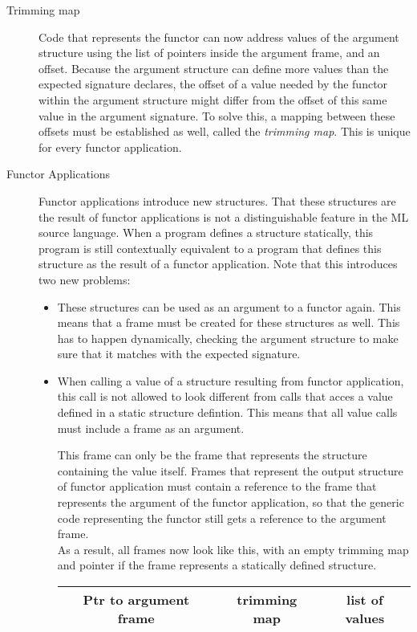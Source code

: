 \documentclass[11pt]{article}
\newcommand{\gray}{\cellcolor{lightgray}}
\begin{document}
\begin{description}
\item[Trimming map]
Code that represents the functor can now address values of the argument structure using the list of pointers inside the argument frame, and an offset.
Because the argument structure can define more values than the expected signature declares, the offset of a value needed by the functor within the argument structure might differ from the offset of this same value in the argument signature.
To solve this, a mapping between these offsets must be established as well, called the \emph{trimming map}. This is unique for every functor application.

\item[Functor Applications]
Functor applications introduce new structures. 
That these structures are the result of functor applications is not a distinguishable feature in the ML source language.
When a program defines a structure statically, this program is still contextually equivalent to a program that defines this structure as the result of a functor application.
Note that this introduces two new problems:
\begin{itemize}
\item 
These structures can be used as an argument to a functor again. This means that a frame must be created for these structures as well.
This has to happen dynamically, checking the argument structure to make sure that it matches with the expected signature.

\item When calling a value of a structure resulting from functor application, this call is not allowed to look different from calls that acces a value defined in a static structure defintion.
This means that all value calls must include a frame as an argument.

This frame can only be the frame that represents the structure containing the value itself.
Frames that represent the output structure of functor application must contain a reference to the frame that represents the argument of the functor application, so that the generic code representing the functor still gets a reference to the argument frame.
\\[1em]
As a result, all frames now look like this, with an empty trimming map and pointer if the frame represents a statically defined structure.

\begin{tabular}{|c c c|}
\hline
Ptr to argument frame & \gray trimming map &  list of values\\
\hline
\end{tabular}
\end{itemize}


\end{description}
\end{document}
